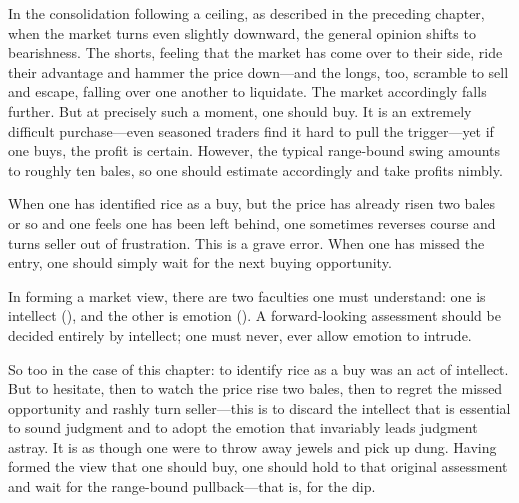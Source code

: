 \commentary
In the consolidation following a ceiling, as described in the
preceding chapter, when the market turns even slightly downward,
the general opinion shifts to bearishness. The shorts, feeling that
the market has come over to their side, ride their advantage and
hammer the price down---and the longs, too, scramble to sell and
escape, falling over one another to liquidate. The market
accordingly falls further. But at precisely such a moment, one
should buy. It is an extremely difficult purchase---even seasoned
traders find it hard to pull the trigger---yet if one buys, the
profit is certain. However, the typical range-bound swing amounts
to roughly ten bales, so one should estimate accordingly and take
profits nimbly.


\begin{sokyubox}
{\small\itshape\color{sokyubar} }

\medskip
When one has identified rice as a buy, but the price has already
risen two bales or so and one feels one has been left behind, one
sometimes reverses course and turns seller out of frustration. This
is a grave error. When one has missed the entry, one should simply
wait for the next buying opportunity.
\end{sokyubox}

\commentary
In forming a market view, there are two faculties one must
understand: one is intellect (), and the other is emotion
(). A forward-looking assessment should be decided entirely
by intellect; one must never, ever allow emotion to intrude.

So too in the case of this chapter: to identify rice as a buy was
an act of intellect. But to hesitate, then to watch the price rise
two bales, then to regret the missed opportunity and rashly turn
seller---this is to discard the intellect that is essential to
sound judgment and to adopt the emotion that invariably leads
judgment astray. It is as though one were to throw away jewels and
pick up dung. Having formed the view that one should buy, one
should hold to that original assessment and wait for the
range-bound pullback---that is, for the dip.



